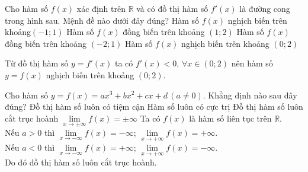 \begin{ex}%
    Cho hàm số $f(x)$ xác định trên $\mathbb{R}$ và có đồ thị hàm số $f'(x)$ là đường cong trong hình sau. Mệnh đề nào dưới đây đúng?
    \immini
    {\choice
        {Hàm số $f(x)$ nghịch biến trên khoảng$(-1;1)$}
        {Hàm số $f(x)$ đồng biến trên khoảng $(1;2)$}
        {Hàm số $f(x)$ đồng biến trên khoảng $(-2;1)$}
        {\True Hàm số $f(x)$ nghịch biến trên khoảng $(0;2)$}}
    {}
    \loigiai
    {Từ đồ thị hàm số $y=f'(x)$ ta có $f'(x)<0,\, \forall x\in (0;2)$ nên hàm số $y=f(x)$ nghịch biến trên khoảng $(0;2)$.}
\end{ex}

\begin{ex}%
    Cho hàm số $y=f(x)=ax^3+bx^2+cx+d\,(a\neq 0)$. Khẳng định nào sau đây đúng?
    \choice
    {Đồ thị hàm số luôn có tiệm cận}
    {Hàm số luôn có cực trị}
    {\True Đồ thị hàm số luôn cắt trục hoành}
    {$\lim\limits_{x\to \pm \infty}f(x)=\pm \infty$}
    \loigiai
    {Ta có $f(x)$ là hàm số liên tục trên $\mathbb{R}$.\\
    Nếu $a>0$ thì $\lim\limits_{x \to -\infty}f(x)=-\infty$; $\lim\limits_{x \to +\infty}f(x)=+\infty$.\\
    Nếu $a<0$ thì $\lim\limits_{x \to -\infty}f(x)=+\infty$; $\lim\limits_{x \to +\infty}f(x)=-\infty$.\\
    Do đó đồ thị hàm số luôn cắt trục hoành.}
\end{ex}


